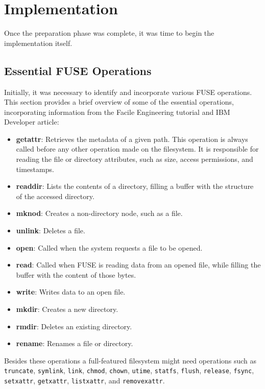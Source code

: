 \chapter{Implementation}
\label{chap:implementation}

Once the preparation phase was complete, it was time to begin the implementation itself.


\section{Essential FUSE Operations}\label{sec:fuse-ops}

Initially, it was necessary to identify and incorporate various FUSE operations.
This section provides a brief overview of some of the essential operations, incorporating information from the Facile Engineering tutorial and IBM Developer article\cite{ibm_fuse, facile_fuse}:

\begin{itemize}
    \item \textbf{getattr}: Retrieves the metadata of a given path.
    This operation is always called before any other operation made on the filesystem.
    It is responsible for reading the file or directory attributes, such as size, access permissions, and timestamps.
    \item \textbf{readdir}: Lists the contents of a directory, filling a buffer with the structure of the accessed directory.
    \item \textbf{mknod}: Creates a non-directory node, such as a file.
    \item \textbf{unlink}: Deletes a file.
    \item \textbf{open}: Called when the system requests a file to be opened.
    \item \textbf{read}: Called when FUSE is reading data from an opened file, while filling the buffer with the content of those bytes.
    \item \textbf{write}: Writes data to an open file.
    \item \textbf{mkdir}: Creates a new directory.
    \item \textbf{rmdir}: Deletes an existing directory.
    \item \textbf{rename}: Renames a file or directory.
\end{itemize}

Besides these operations a full-featured filesystem might need operations such as \texttt{truncate}, \texttt{symlink}, \texttt{link}, \texttt{chmod}, \texttt{chown}, \texttt{utime}, \texttt{statfs}, \texttt{flush}, \texttt{release}, \texttt{fsync}, \texttt{setxattr}, \texttt{getxattr}, \texttt{listxattr}, and \texttt{removexattr}.

